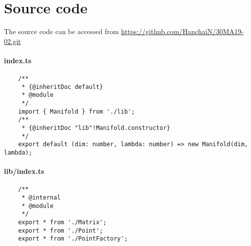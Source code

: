 \documentclass[../main.tex]{subfiles}
\begin{document}
\section{Source code}
The source code can be accessed from \url{https://github.com/HanchaiN/30MA19-02.git}
\paragraph{index.ts}
\begin{verbatim}
    /**
     * {@inheritDoc default}
     * @module
     */
    import { Manifold } from './lib';
    /**
     * {@inheritDoc "lib"!Manifold.constructor}
     */
    export default (dim: number, lambda: number) => new Manifold(dim, lambda);
\end{verbatim}
\paragraph{lib/index.ts}
\begin{verbatim}
    /**
     * @internal
     * @module
     */
    export * from './Matrix';
    export * from './Point';
    export * from './PointFactory';
\end{verbatim}
\end{document}
